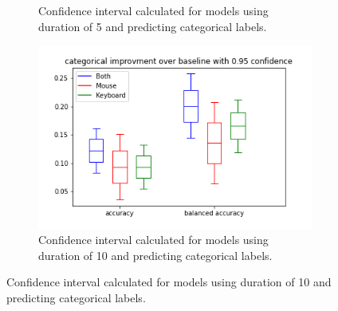 \begin{figure}[!h]
\begin{subfigure}[b]{0.31\textwidth}
        \caption{Confidence interval calculated for models using duration of 5 and predicting categorical labels.}
    \end{subfigure}
    \begin{subfigure}[b]{0.31\textwidth}
        \centering
        \includegraphics[width=\textwidth]{figures/results/interval_difference/10/10_categorical_0.95.png}
        \captionsetup{justification=centering}
        \caption{Confidence interval calculated for models using duration of 10 and predicting categorical labels.}
    \end{subfigure}



\end{figure}
